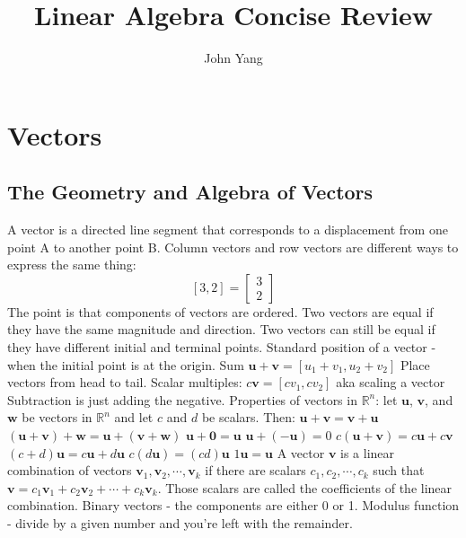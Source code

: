 \documentclass{article}
\title{Linear Algebra Concise Review} %
\author{John Yang}
\begin{document}
    \maketitle
    \tableofcontents
    \newpage
    \section{Vectors} %
        \subsection{The Geometry and Algebra of Vectors}
        \begin{outline}
            \1 A vector is a directed line segment that corresponds to a displacement from one point A to another point B. 
            \1 Column vectors and row vectors are different ways to express the same thing: \[[3,2]=\begin{bmatrix}3 \\ 2\end{bmatrix}\]
            \1 The point is that components of vectors are ordered. 
            \1 Two vectors are equal if they have the same magnitude and direction. Two vectors can still be equal if they have different initial and terminal points. 
            \1 Standard position of a vector - when the initial point is at the origin. 
            \1 Sum \(\mathbf u+\mathbf v=[u_1+v_1,u_2+v_2]\)
            \1 Place vectors from head to tail. 
            \1 Scalar multiples: \(c\mathbf v=[cv_1,cv_2]\) aka scaling a vector
            \1 Subtraction is just adding the negative. 
            \1 Properties of vectors in \(\mathbb{R}^n\): let \(\mathbf u\), \(\mathbf v\), and \(\mathbf w\) be vectors in \(\mathbb{R}^n\) and let $c$ and $d$ be scalars. Then: 
                \2 \(\mathbf u+\mathbf v=\mathbf v+\mathbf u\)
                \2 \((\mathbf u+\mathbf v)+\mathbf w=\mathbf u+(\mathbf v+\mathbf w)\)
                \2 \(\mathbf u+\mathbf 0=\mathbf u\)
                \2 \(\mathbf u+(-\mathbf u)=0\)
                \2 \(c(\mathbf u+\mathbf v)=c\mathbf u+c\mathbf v\)
                \2 \((c+d)\mathbf u=c\mathbf u+d\mathbf u\)
                \2 \(c(d\mathbf u)=(cd)\mathbf u\)
                \2 \(1\mathbf u=\mathbf u\)
            \1 A vector $\mathbf v$ is a linear combination of vectors \(\mathbf v_1,\mathbf v_2,\cdots,\mathbf v_k\) if there are scalars \(c_1,c_2,\cdots,c_k\) such that \(\mathbf v=c_1\mathbf v_1+c_2\mathbf v_2+\cdots+c_k\mathbf v_k\). Those scalars are called the coefficients of the linear combination. 
            \1 Binary vectors - the components are either 0 or 1. 
            \1 Modulus function - divide by a given number and you're left with the remainder. 

        \end{outline}
\end{document}
